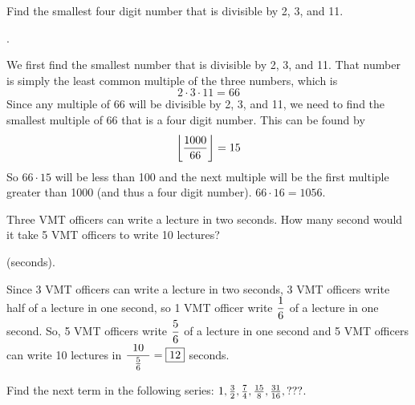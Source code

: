 \documentclass[11pt]{article}
\DeclareRobustCommand{\frac}[3][0pt]{%
  {\begingroup\hspace{#1}#2\hspace{#1}\endgroup\over\hspace{#1}#3\hspace{#1}}}
\begin{document}
\begin{problem}Find the smallest four digit number that is divisible by 2, 3, and 11.
\end{problem}
\begin{answer}
.
\end{answer}
\begin{solution}
We first find the smallest number that is divisible by 2, 3, and 11. That number is simply the least common multiple of the three numbers, which is 
$$2\cdot 3\cdot 11=66$$
Since any multiple of 66 will be divisible by 2, 3, and 11, we need to find the smallest multiple of 66 that is a four digit number. This can be found by
$$\floor{\frac{1000}{66}}=15$$
So $66 \cdot 15$ will be less than 100 and the next multiple will be the first multiple greater than 1000 (and thus a four digit number). $66 \cdot 16 = \boxed{1056}.$
\end{solution}


\begin{problem}
\end{problem}

\begin{problem}
\end{problem}

\begin{problem}
\end{problem}

\begin{problem}
\end{problem}



\begin{problem}Three VMT officers can write a lecture in two seconds. How many second would it take 5 VMT officers to write 10 lectures?
\end{problem}

 (seconds).
\begin{solution}
Since 3 VMT officers can write a lecture in two seconds, 3 VMT officers write half of a lecture in one second, so 1 VMT officer write $\displaystyle \frac{1}{6}$ of a lecture in one second. So, 5 VMT officers write $\displaystyle \frac{5}{6}$ of a lecture in one second and 5 VMT officers can write 10 lectures in $\displaystyle \frac[5pt]{10}{\frac{5}{6}} = \boxed{12}$ seconds.
\end{solution}

\begin{problem}Find the next term in the following series: $1, \frac{3}{2}, \frac{7}{4}, \frac{15}{8}, \frac{31}{16}, ???$.
\end{problem}
\end{document}
